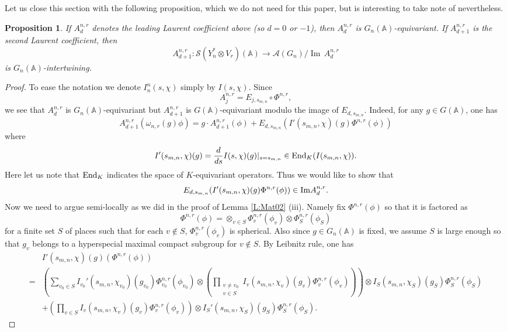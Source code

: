 \documentclass[10pt]{amsart}
\theoremstyle{plain}
\newtheorem{Prop}[equation]{Proposition}
\numberwithin{equation}{section}
\begin{document}
Let us close this section with the following proposition, which we do
not need for this paper, but is interesting to take note of nevertheless.
\begin{Prop}  \label{P:A0}
If $A^{n,r}_d$ denotes the leading Laurent coefficient above (so $d=0$
or $-1$), then $A^{n,r}_d$ is  $G_n({\mathbb{A}})$-equivariant. If
$A_{d+1}^{n,r}$ is the second Laurent coefficient, then
\[  A^{n,r}_{d+1}: \mathcal{S}(Y_n^* \otimes V_r)({\mathbb{A}}) \longrightarrow
\mathcal{A}(G_n)/ {\operatorname{Im\,}} A^{n,r}_d \]
is $G_n({\mathbb{A}})$-intertwining.
\end{Prop}

\begin{proof}
To ease the notation we denote $I_n^n(s,\chi)$ simply by $I(s,\chi)$.
Since 
\[   A_j^{n,r}  = E_{j, s_{m,n}} \circ \Phi^{n,r}, \]
we see that $A^{n,r}_d$ is $G_n({\mathbb{A}})$-equivariant but $A_{d+1}^{n,r}$
is $G({\mathbb{A}})$-equivariant modulo the image of $E_{d, s_{m,n}}$. Indeed, for
any $g \in G({\mathbb{A}})$, one has
\[  A_{d+1}^{n,r}( \omega_{n,r}(g) \phi)  
=  g \cdot A_{d+1}^{n,r}(\phi)  + E_{d, s_{m,n}}( I'(s_{m,n}, \chi)(g)
\Phi^{n,r}(\phi) ) \]
where
\[   I'(s_{m,n}, \chi)(g) = \frac{d}{ds} I(s, \chi)(g)  |_{s= s_{m,n}}
\in {\rm End}_K(I(s_{m,n},\chi)). \] 
Here let us note that ${\rm End}_K$ indicates the space of $K$-equivariant operators.
Thus we would like to show that
\[  E_{d, s_{m,n}}( I'(s_{m,n}, \chi)(g) \Phi^{n,r}(\phi) )  \in {\rm Im} A^{n,r}_{d}. \]
Now we need to argue semi-locally as we did in the proof of Lemma
\ref{L:Mat02} (iii). Namely fix $\Phi^{n,r}(\phi)$ so that it is
factored as 
\[  \Phi^{n,r}(\phi)=\otimes_{v\in
  S}\Phi_v^{n,r}(\phi_v)\otimes \Phi_S^{n,r}(\phi_S) \]
  for a finite set $S$ of places such that for each $v\notin S$, $\Phi_v^{n,r}(\phi_v)$ is
spherical. Also since $g\in G_n({\mathbb{A}})$ is fixed, we assume $S$ is large
enough so that $g_v$ belongs to a hyperspecial maximal compact subgroup for $v\notin S$. By
Leibnitz rule, one has
\begin{align*}
&I'(s_{m,n}, \chi)(g)\left( \Phi^{n,r}(\phi)\right)\\ 
=&\left(\sum_{v_0\in S}I_{v_0}'(s_{m,n}, \chi_{v_0})(g_{v_0}) \Phi_{v_0}^{n,r}(\phi_{v_0})
\otimes  \left( \prod_{\substack{v \ne v_0\\v\in S}}  I_v(s_{m,n}, \chi_v)(g_v)
  \Phi_v^{n,r}(\phi_v) \right)\right)\otimes I_{S}(s_{m,n},
\chi_{S})(g_{S}) \Phi_{S}^{n,r}(\phi_{S})\\
&+\left(\prod_{v\in S}I_v(s_{m,n},
  \chi_v)(g_v)\Phi_v^{n,r}(\phi_v)\right)\otimes
I_{S}'(s_{m,n},\chi_{S})(g_{S}) \Phi_{S}^{n,r}(\phi_{S}).
\end{align*}


\end{proof}
\end{document}
